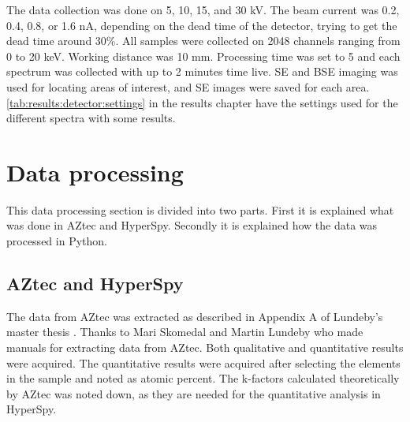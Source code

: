 The data collection was done on 5, 10, 15, and 30 kV.
The beam current was 0.2, 0.4, 0.8, or 1.6 nA, depending on the dead time of the detector, trying to get the dead time around 30\%.
All samples were collected on 2048 channels ranging from 0 to 20 keV.
Working distance was 10 mm.
Processing time was set to 5 and each spectrum was collected with up to 2 minutes time live.
SE and BSE imaging was used for locating areas of interest, and SE images were saved for each area.
\cref{tab:results:detector:settings} in the results chapter have the settings used for the different spectra with some results.


%
%
\section{Data processing}
\label{sec:method:data_processing}

This data processing section is divided into two parts.
First it is explained what was done in AZtec and HyperSpy.
Secondly it is explained how the data was processed in Python.

\subsection{AZtec and HyperSpy}
\label{sec:method:data_processing:aztec_hyperspy}

The data from AZtec was extracted as described in Appendix A of Lundeby's master thesis \cite{lundeby_improving_2019}.
Thanks to Mari Skomedal \cite{skomedal_improving_2022} and Martin Lundeby \cite{lundeby_improving_2019} who made manuals for extracting data from AZtec.
Both qualitative and quantitative results were acquired.
The quantitative results were acquired after selecting the elements in the sample and noted as atomic percent.
The k-factors calculated theoretically by AZtec was noted down, as they are needed for the quantitative analysis in HyperSpy.

